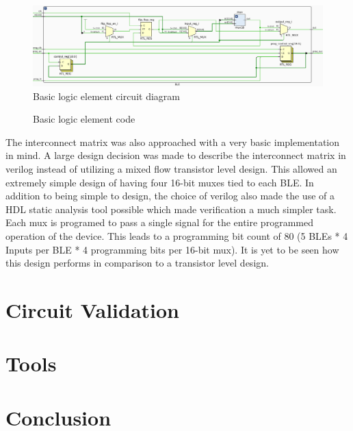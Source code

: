 \documentclass[12pt]{article}
\begin{document}
\begin{figure}[h]
    \centering
    \includegraphics[width=\textwidth]{circuit_ble}
    \caption{Basic logic element circuit diagram}
    \label{fig:ble}
\end{figure}

\begin{figure}[h]
    
    \caption{Basic logic element code}
    \label{code:ble}
\end{figure}

The interconnect matrix was also approached with a very basic implementation in mind. 
A large design decision was made to describe the interconnect matrix in verilog 
instead of utilizing a mixed flow transistor level design. This allowed an extremely 
simple design of having four 16-bit muxes tied to each BLE. In addition to being 
simple to design, the choice of verilog also made the use of a HDL static analysis 
tool possible which made verification a much simpler task. Each mux is programed 
to pass a single signal for the entire programmed operation of the device. This leads 
to a programming bit count of 80 (5 BLEs * 4 Inputs per BLE * 4 programming bits 
per 16-bit mux). It is yet to be seen how this design performs in comparison to a 
transistor level design.

\newpage
\section{Circuit Validation}

\newpage
\section{Tools}

\newpage
\section{Conclusion}

{}

\end{document}
